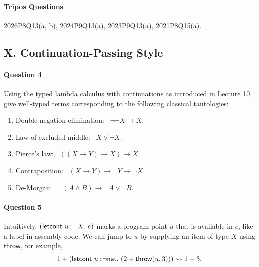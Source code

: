 \documentclass[11pt,a4paper,twoside]{article}
\begin{document}
\paragraph{Tripos Questions} 2026P8Q13(a, b), 2024P9Q13(a), 2023P9Q13(a), 2021P8Q15(a).

\subsection*{X. Continuation-Passing Style}

\paragraph{Question 4} Using the typed lambda calculus with
continuations as introduced in Lecture 10,
give well-typed terms corresponding to the following classical tautologies:

\begin{enumerate}[label=(\alph*)]
  \item Double-negation elimination: \ $\neg\neg X \to X$.

  \item Law of excluded middle: \ $X \lor \neg X$.

  \item Pierce's law: \ $((X \to Y) \to X) \to X$.

  \item Contraposition: \ $(X \to Y) \to \neg Y \to \neg X$.

  \item De-Morgan: \ $\neg(A \land B) \to \neg A \lor \neg B$.
\end{enumerate}

\paragraph{Question 5}
Intuitively, $(\mathsf{letcont}\ \var{u}{\neg X}.\ e)$ marks a
program point $u$ that is available in $e$,
like a label in assembly code.
We can jump to $u$ by supplying an item of type $X$ using
$\mathsf{throw}$, for example,
\[
  1 + (\mathsf{letcont}\ \var{u}{\neg \mathsf{nat}}.\ (2 +
  \mathsf{throw}(u, 3)))
  \rightsquigarrow
  1 + 3.
\]
\end{document}
